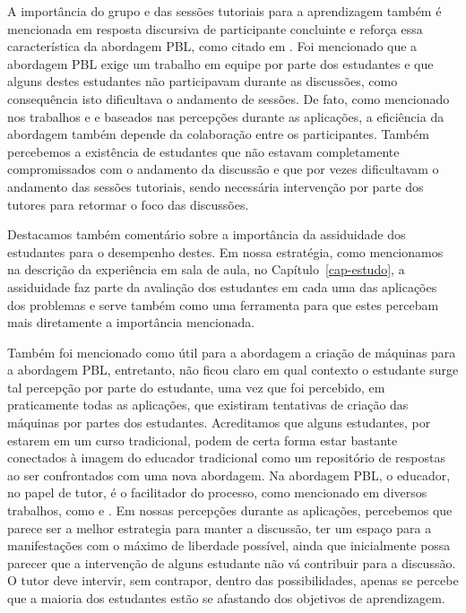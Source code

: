 A importância do grupo e das sessões tutoriais para a aprendizagem
também é mencionada em resposta discursiva de participante concluinte
e reforça essa característica da abordagem \ac{PBL}, como citado
em .
Foi mencionado que a abordagem \ac{PBL} exige um trabalho em equipe por
parte dos estudantes e que alguns destes estudantes não participavam
durante as discussões, como consequência isto dificultava o
andamento de sessões.
De fato, como mencionado nos
trabalhos  e 
e baseados nas percepções durante as aplicações, a eficiência da abordagem
também depende da colaboração entre os participantes.
Também percebemos a existência de estudantes que não estavam
completamente compromissados com o andamento da discussão e que
por vezes dificultavam o andamento das sessões tutoriais, sendo necessária
intervenção por parte dos tutores para retormar o foco das discussões.

Destacamos também comentário sobre a importância da assiduidade dos
estudantes para o desempenho destes.
Em nossa estratégia, como mencionamos na descrição da experiência
em sala de aula, no Capítulo~\ref{cap-estudo}, a assiduidade faz
parte da avaliação dos estudantes em cada uma das aplicações dos
problemas e serve também como uma ferramenta para que estes
percebam mais diretamente a importância mencionada.

Também foi mencionado como útil para a abordagem a criação de máquinas
para a abordagem \ac{PBL}, entretanto, não ficou claro em qual contexto
o estudante surge tal percepção por parte do estudante,
uma vez que foi percebido, em praticamente todas as aplicações, que
existiram tentativas de criação das máquinas por partes
dos estudantes.
Acreditamos que alguns estudantes, por estarem em um curso
tradicional, podem de certa forma estar bastante conectados
à imagem do educador tradicional como um repositório de
respostas ao ser confrontados com uma nova abordagem.
Na abordagem \ac{PBL}, o educador, no papel de tutor, é o facilitador
do processo, como mencionado em diversos trabalhos, como
 e .
Em nossas percepções durante as aplicações, percebemos que
parece ser a melhor estrategia para manter a discussão, ter um
espaço para a manifestações com o máximo de liberdade possível,
ainda que inicialmente possa parecer que a intervenção
de alguns estudante não vá contribuir para
a discussão.
O tutor deve intervir, sem contrapor, dentro das possibilidades,
apenas se percebe que a maioria dos estudantes estão se afastando
dos objetivos de aprendizagem.

